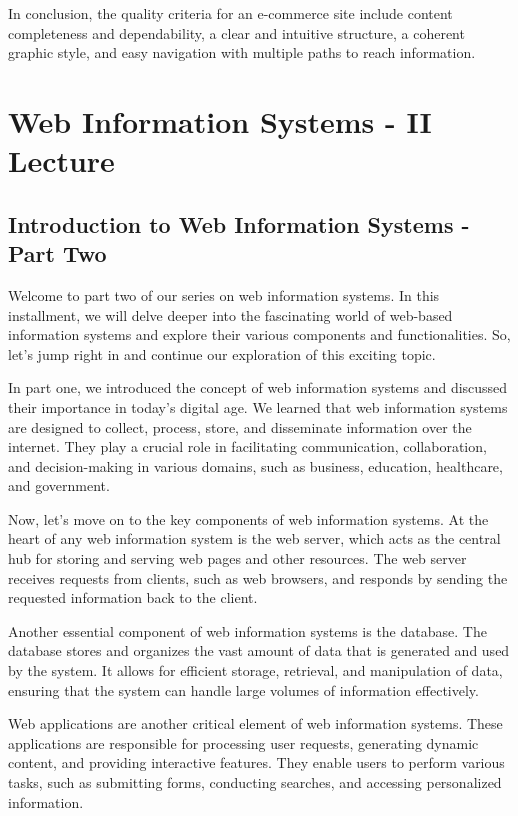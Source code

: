 In conclusion, the quality criteria for an e-commerce site include
content completeness and dependability, a clear and intuitive structure,
a coherent graphic style, and easy navigation with multiple paths to
reach information.

\section{Web Information Systems - II Lecture}
\subsection{Introduction to Web Information Systems - Part
  Two}\label{introduction-to-web-information-systems---part-two}

Welcome to part two of our series on web information systems. In this
installment, we will delve deeper into the fascinating world of
web-based information systems and explore their various components and
functionalities. So, let's jump right in and continue our exploration of
this exciting topic.

In part one, we introduced the concept of web information systems and
discussed their importance in today's digital age. We learned that web
information systems are designed to collect, process, store, and
disseminate information over the internet. They play a crucial role in
facilitating communication, collaboration, and decision-making in
various domains, such as business, education, healthcare, and
government.

Now, let's move on to the key components of web information systems. At
the heart of any web information system is the web server, which acts as
the central hub for storing and serving web pages and other resources.
The web server receives requests from clients, such as web browsers, and
responds by sending the requested information back to the client.

Another essential component of web information systems is the database.
The database stores and organizes the vast amount of data that is
generated and used by the system. It allows for efficient storage,
retrieval, and manipulation of data, ensuring that the system can handle
large volumes of information effectively.

Web applications are another critical element of web information
systems. These applications are responsible for processing user
requests, generating dynamic content, and providing interactive
features. They enable users to perform various tasks, such as submitting
forms, conducting searches, and accessing personalized information.

